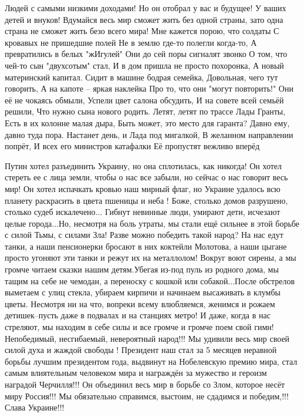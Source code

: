 Людей с самыми низкими доходами! Но он отобрал у вас и будущее! У ваших детей и
внуков! Вдумайся весь мир сможет жить без одной страны, зато одна страна не
сможет жить безо всего мира!
Мне кажется порою, что солдаты
С кровавых не пришедшие полей
Не в землю где-то полегли когда-то,
А превратились в белых "жИгулей"
Они до сей поры сигналят звонко
О том, что чей-то сын "двухсотым" стал,
И в дом пришла не просто похоронка,
А новый материнский капитал.
Сидит в машине бодрая семейка,
Довольная, чего тут говорить,
А на капоте – яркая наклейка
Про то, что они "могут повторить!"
Они её не чокаясь обмыли,
Успели цвет салона обсудить,
И на совете всей семьёй решили,
Что нужно сына нового родить.
Летят, летят по трассе Лады Гранты,
Есть в их колонне малая дыра,
Быть может, это место для гаранта?
Давно ему, давно туда пора.
Настанет день, и Лада под мигалкой,
В желанном направлении попрёт,
И всех его министров катафалки
Её пропустят вежливо вперёд


Путин хотел разъединить Украину, но она сплотилась, как никогда! Он хотел
стереть ее с лица земли, чтобы о нас все забыли, но сейчас о нас говорит весь
мир! Он хотел испачкать кровью наш мирный флаг, но Украине удалось всю планету
раскрасить в цвета пшеницы и неба ! Боже, столько домов разрушено, столько
судеб искалечено... Гибнут невинные люди, умирают дети, исчезают целые
города...Но, несмотря на боль утраты, мы стали ещё сильнее в этой борьбе с
силой Тьмы, с силами Зла! Разве можно победить такой народ? На нас едут танки,
а наши пенсионерки бросают в них коктейли Молотова, а наши цыгане просто
угоняют эти танки и режут их на металлолом! Вокруг воют сирены, а мы громче
читаем сказки нашим детям.Убегая из-под пуль из родного дома, мы тащим на себе
не чемодан, а переноску с кошкой или собакой...После обстрелов выметаем с улиц
стекла, убираем кирпичи и начинаем высаживать в клумбы цветы. Несмотря ни на
что, вопреки всему влюбляемся, женимся и рожаем детишек--пусть даже в подвалах
и на станциях метро! И даже, когда в нас стреляют, мы находим в себе силы и все
громче и громче поем свой гимн! Непобедимый, несгибаемый, невероятный народ!!!
Мы удивили весь мир своей силой духа и жаждой свободы ! Президент наш стал за 5
месяцев неравной борьбы лучшим президентом года, выдвинут на Нобелевскую премию
мира, стал самым влиятельным человеком мира и награждён за мужество и героизм
наградой Черчилля!!! Он объединил весь мир в борьбе со Злом, которое несёт миру
Россия!!! Мы обязательно справимся, выстоим, не сдадимся и победим,!!!Слава
Украине!!!

